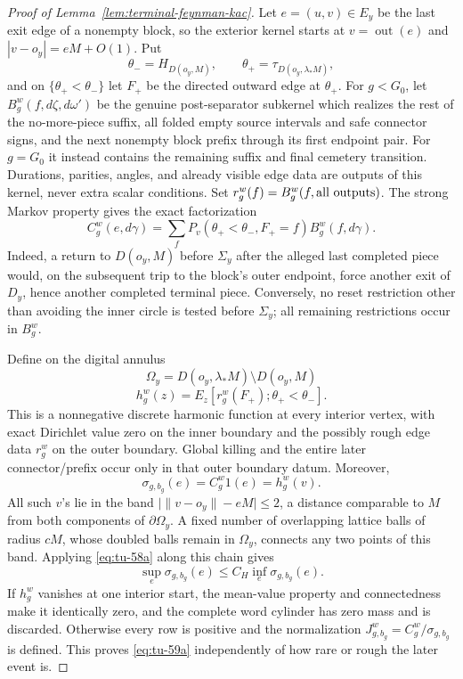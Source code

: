 \begin{proof}[Proof of Lemma~\ref{lem:terminal-feynman-kac}]
Let \(e=(u,v)\in E_y\) be the last exit edge of a nonempty block, so the
exterior kernel starts at \(v=\operatorname{out}(e)\) and
\(|v-o_y|=eM+O(1)\).  Put
\[
 \theta_-=H_{D(o_y,M)},\qquad
 \theta_+=\tau_{D(o_y,\lambda_*M)},
\]
and on \(\{\theta_+<\theta_-\}\) let \(F_+\) be the directed outward
edge at \(\theta_+\).  For \(g<G_0\), let
\(B_g^w(f,d\zeta,d\omega')\) be the genuine post-separator subkernel
which realizes the rest of the no-more-piece suffix, all folded empty
source intervals and safe connector signs, and the next nonempty block
prefix through its first endpoint pair.  For \(g=G_0\) it instead contains
the remaining suffix and final cemetery transition.  Durations, parities,
angles, and already visible edge data are outputs of this kernel, never
extra scalar conditions.  Set \(r_g^w(f)=B_g^w(f,\hbox{all outputs})\).
The strong Markov property gives the exact factorization
\begin{equation}
 C_g^w(e,d\gamma)=\sum_f
 P_v(\theta_+<\theta_-,F_+=f)B_g^w(f,d\gamma).              \tag{59a1}\label{eq:tu-59a1}
\end{equation}
Indeed, a return to \(D(o_y,M)\) before \(\Sigma_y\) after the alleged
last completed piece would, on the subsequent trip to the block's outer
endpoint, force another exit of \(D_y\), hence another completed terminal
piece.  Conversely, no reset restriction other than avoiding the inner
circle is tested before \(\Sigma_y\); all remaining restrictions occur in
\(B_g^w\).

Define on the digital annulus
\[
 \Omega_y=D(o_y,\lambda_*M)\setminus D(o_y,M)
\]
\begin{equation}
 h_g^w(z)=E_z[r_g^w(F_+);\theta_+<\theta_-].                \tag{59a2}\label{eq:tu-59a2}
\end{equation}
This is a nonnegative discrete harmonic function at every interior vertex,
with exact Dirichlet value zero on the inner boundary and the possibly rough
edge data \(r_g^w\) on the outer boundary.  Global killing and the entire
later connector/prefix occur only in that outer boundary datum.  Moreover,
\begin{equation}
                  \sigma_{g,b_g}(e)=C_g^w1(e)=h_g^w(v).     \tag{59a3}\label{eq:tu-59a3}
\end{equation}
All such \(v\)'s lie in the band
\(\bigl|\|v-o_y\|-eM\bigr|\le2\), a distance
comparable to \(M\) from both components of \(\partial\Omega_y\).
A fixed number of overlapping lattice balls of radius \(cM\), whose doubled
balls remain in \(\Omega_y\), connects any two points of this band.
Applying \eqref{eq:tu-58a} along this chain gives
\begin{equation}
       \sup_e\sigma_{g,b_g}(e)
              \le C_H\inf_e\sigma_{g,b_g}(e).              \tag{59a}\label{eq:tu-59a}
\end{equation}
If \(h_g^w\) vanishes at one interior start, the mean-value property and
connectedness make it identically zero, and the complete word cylinder has
zero mass and is discarded.  Otherwise every row is positive and the
normalization \(J_{g,b_g}^w=C_g^w/\sigma_{g,b_g}\) is defined.  This proves
\eqref{eq:tu-59a} independently of how rare or rough the later event is.


\end{proof}
